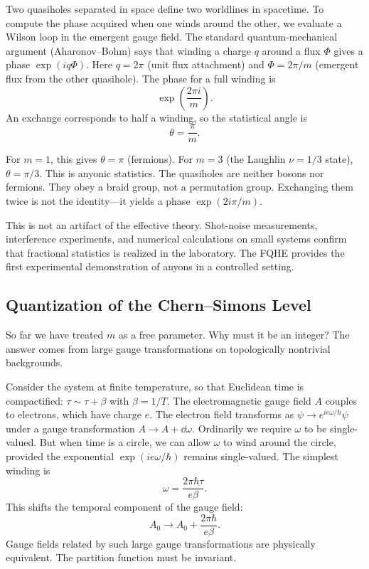 Two quasiholes separated in space define two worldlines in spacetime. To compute the phase acquired when one winds around the other, we evaluate a Wilson loop in the emergent gauge field. The standard quantum-mechanical argument (Aharonov--Bohm) says that winding a charge $q$ around a flux $\Phi$ gives a phase $\exp(iq\Phi)$. Here $q=2\pi$ (unit flux attachment) and $\Phi = 2\pi/m$ (emergent flux from the other quasihole). The phase for a full winding is
\begin{equation}
  \exp\left(\frac{2\pi i}{m}\right).
  \label{eq:fqhe-full-winding}
\end{equation}
An exchange corresponds to half a winding, so the statistical angle is
\begin{equation}
  \theta = \frac{\pi}{m}.
  \label{eq:fqhe-statistical-angle}
\end{equation}

For $m=1$, this gives $\theta=\pi$ (fermions). For $m=3$ (the Laughlin $\nu=1/3$ state), $\theta=\pi/3$. This is anyonic statistics. The quasiholes are neither bosons nor fermions. They obey a braid group, not a permutation group. Exchanging them twice is not the identity---it yields a phase $\exp(2i\pi/m)$.

This is not an artifact of the effective theory. Shot-noise measurements, interference experiments, and numerical calculations on small systems confirm that fractional statistics is realized in the laboratory. The FQHE provides the first experimental demonstration of anyons in a controlled setting.

\subsection{Quantization of the Chern--Simons Level}
\label{subsec:fqhe-quantization}

So far we have treated $m$ as a free parameter. Why must it be an integer? The answer comes from large gauge transformations on topologically nontrivial backgrounds.

Consider the system at finite temperature, so that Euclidean time is compactified: $\tau\sim\tau+\beta$ with $\beta=1/T$. The electromagnetic gauge field $A$ couples to electrons, which have charge $e$. The electron field transforms as $\psi\to e^{ie\omega/\hbar}\psi$ under a gauge transformation $A\to A+\dd\omega$. Ordinarily we require $\omega$ to be single-valued. But when time is a circle, we can allow $\omega$ to wind around the circle, provided the exponential $\exp(ie\omega/\hbar)$ remains single-valued. The simplest winding is
\begin{equation}
  \omega = \frac{2\pi\hbar\tau}{e\beta}.
  \label{eq:fqhe-large-gauge}
\end{equation}
This shifts the temporal component of the gauge field:
\begin{equation}
  A_0 \to A_0 + \frac{2\pi\hbar}{e\beta}.
  \label{eq:fqhe-large-gauge-shift}
\end{equation}
Gauge fields related by such large gauge transformations are physically equivalent. The partition function must be invariant.

